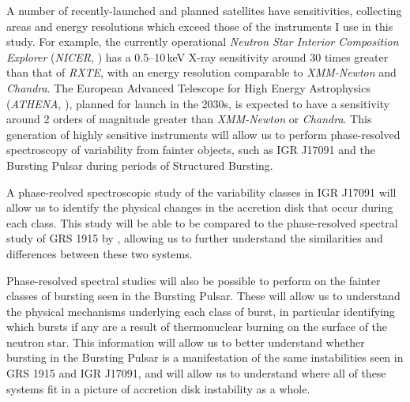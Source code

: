 \par A number of recently-launched and planned satellites have sensitivities, collecting areas and energy resolutions which exceed those of the instruments I use in this study.  For example, the currently operational \textit{Neutron Star Interior Composition Explorer} (\textit{NICER}, \citealp{Gendreau_Nicer}) has a 0.5--10\,keV X-ray sensitivity around 30 times greater than that of \textit{RXTE}\indexrxte , with an energy resolution comparable to \textit{XMM-Newton} and \textit{Chandra}\indexxmm\indexchandra.  The European Advanced Telescope for High Energy Astrophysics (\textit{ATHENA}, \citealp{Johnson_Athena}), planned for launch in the 2030s, is expected to have a sensitivity around 2 orders of magnitude greater than \textit{XMM-Newton} or \textit{Chandra}.  This generation of highly sensitive instruments will allow us to perform phase-resolved spectroscopy of variability from fainter objects, such as IGR J17091 and the Bursting Pulsar during periods of Structured Bursting.
\par A phase-reolved spectroscopic study of the variability classes in IGR J17091 will allow us to identify the physical changes in the accretion disk that occur during each class.  This study will be able to be compared to the phase-resolved spectral study of GRS 1915 by \citet{Neilsen_GRSModel}, allowing us to further understand the similarities and differences between these two systems.
\par Phase-resolved spectral studies will also be possible to perform on the fainter classes of bursting seen in the Bursting Pulsar.  These will allow us to understand the physical mechanisms underlying each class of burst, in particular identifying which bursts if any are a result of thermonuclear burning on the surface of the neutron star.  This information will allow us to better understand whether bursting in the Bursting Pulsar is a manifestation of the same instabilities seen in GRS 1915 and IGR J17091, and will allow us to understand where all of these systems fit in a picture of accretion disk instability as a whole.